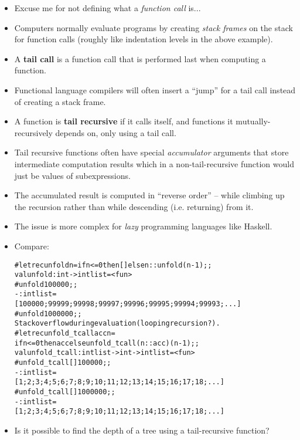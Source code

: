 \documentclass{beamer}
\newcommand{\tmem}[1]{{\em #1\/}}
\newcommand{\tmstrong}[1]{\textbf{#1}}
\newenvironment{tmcode}[1][]{\begin{alltt} }{\end{alltt}}
\begin{document}
\begin{itemize}
  \item Excuse me for not defining what a {\tmem{function call}} is...
  
  \item Computers normally evaluate programs by creating {\tmem{stack frames}}
  on the stack for function calls (roughly like indentation levels in the
  above example).
  
  \item A {\tmstrong{tail call}} is a function call that is performed last
  when computing a function.
  
  \item Functional language compilers will often insert a ``jump'' for a tail
  call instead of creating a stack frame.
  
  \item A function is {\tmstrong{tail recursive}} if it calls itself, and
  functions it mutually-recursively depends on, only using a tail call.
  
  \item Tail recursive functions often have special {\tmem{accumulator}}
  arguments that store intermediate computation results which in a
  non-tail-recursive function would just be values of subexpressions.
  
  \item The accumulated result is computed in ``reverse order'' -- while
  climbing up the recursion rather than while descending (i.e. returning) from
  it.
  
  \item The issue is more complex for {\tmem{lazy}} programming languages like
  Haskell.
  
  \item Compare:
  
  {\small{\begin{tmcode}
  \# let rec unfold n = if n <= 0 then [] else n :: unfold (n-1);;
val unfold : int -> int list = <fun>
# unfold 100000;;
- : int list =
[100000; 99999; 99998; 99997; 99996; 99995; 99994; 99993; ...]
# unfold 1000000;;
Stack overflow during evaluation (looping recursion?).
# let rec unfold_tcall acc n =
  if n <= 0 then acc else unfold_tcall (n::acc) (n-1);;
  val unfold_tcall : int list -> int -> int list = <fun>
# unfold_tcall [] 100000;;
- : int list =
[1; 2; 3; 4; 5; 6; 7; 8; 9; 10; 11; 12; 13; 14; 15; 16; 17; 18; ...]
# unfold_tcall [] 1000000;;
- : int list =
[1; 2; 3; 4; 5; 6; 7; 8; 9; 10; 11; 12; 13; 14; 15; 16; 17; 18; ...]
  \end{tmcode}}}
  
  \item Is it possible to find the depth of a tree using a tail-recursive
  function?
\end{itemize}
\end{document}
